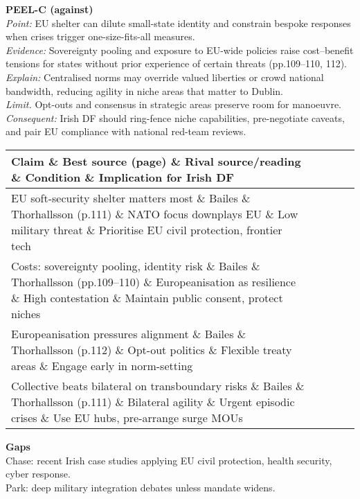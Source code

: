 \textbf{PEEL-C (against)}\\
\textit{Point:} EU shelter can dilute small-state identity and constrain bespoke responses when crises trigger one-size-fits-all measures.\\
\textit{Evidence:} Sovereignty pooling and exposure to EU-wide policies raise cost–benefit tensions for states without prior experience of certain threats (pp.109–110, 112).\\  
\textit{Explain:} Centralised norms may override valued liberties or crowd national bandwidth, reducing agility in niche areas that matter to Dublin.\\
\textit{Limit.} Opt-outs and consensus in strategic areas preserve room for manoeuvre.\\
\textit{Consequent:} Irish DF should ring-fence niche capabilities, pre-negotiate caveats, and pair EU compliance with national red-team reviews.

\begin{tabular}{p{3.2cm}p{4.2cm}p{3.6cm}p{3.2cm}p{4.2cm}}
	\textbf{Claim} \& \textbf{Best source (page)} \& \textbf{Rival source/reading} \& \textbf{Condition} \& \textbf{Implication for Irish DF}\\\hline
	EU soft-security shelter matters most \& Bailes \& Thorhallsson (p.111) \& NATO focus downplays EU \& Low military threat \& Prioritise EU civil protection, frontier tech \\
	Costs: sovereignty pooling, identity risk \& Bailes \& Thorhallsson (pp.109–110) \& Europeanisation as resilience \& High contestation \& Maintain public consent, protect niches \\
	Europeanisation pressures alignment \& Bailes \& Thorhallsson (p.112) \& Opt-out politics \& Flexible treaty areas \& Engage early in norm-setting \\
	Collective beats bilateral on transboundary risks \& Bailes \& Thorhallsson (p.111) \& Bilateral agility \& Urgent episodic crises \& Use EU hubs, pre-arrange surge MOUs \\
\end{tabular}

\textbf{Gaps}\\
Chase: recent Irish case studies applying EU civil protection, health security, cyber response.\\
Park: deep military integration debates unless mandate widens.

\parencite{BAILES_2013}

